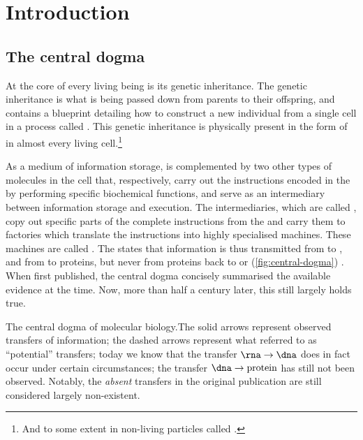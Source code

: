 \chapter{Introduction}


\section{The central dogma}

At the core of every living being is its genetic inheritance. The genetic
inheritance is what is being passed down from parents to their offspring, and
contains a blueprint detailing how to construct a new individual from a single
cell in a process called . This genetic inheritance is
physically present in the form of \dna in almost every living cell.\footnote{And
to some extent in non-living particles called .}

As a medium of information storage, \dna is complemented by two other types of
molecules in the cell that, respectively, carry out the instructions encoded in
the \dna by performing specific biochemical functions, and serve as an
intermediary between information storage and execution. The intermediaries,
which are called , copy out specific parts of the complete
instructions from the \dna and carry them to factories which translate the
instructions into highly specialised machines. These machines are called
. The  states that
information is thus transmitted from \dna to \rna, and from \rna to proteins,
but never from proteins back to \rna or \dna (\cref{fig:central-dogma})
\citep{Crick:1958,Crick:1970}. When first published, the central dogma concisely
summarised the available evidence at the time. Now, more than half a century
later, this still largely holds true.

    {The central dogma of molecular biology.}{The solid arrows represent
    observed transfers of information; the dashed arrows represent what
    \citet{Crick:1970} referred to as “potential” transfers; today we know that
    the transfer \(\text{\rna}\rightarrow\text{\dna}\) does in fact occur under
    certain circumstances; the transfer \(\text{\dna}\rightarrow\text{protein}\)
    has still not been observed. Notably, the \emph{absent} transfers in the
    original publication are still considered largely non-existent.}

